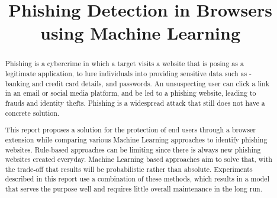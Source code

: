 \documentclass[conference]{IEEEtran}
\begin{document}
\title{Phishing Detection in Browsers \linebreak using Machine Learning\\
}

\author{
    \and

}

\maketitle

\begin{abstract}

    Phishing is a cybercrime in which a target visits a website that is posing as a legitimate application, to lure individuals into providing sensitive data such as - banking and credit card details, and passwords.
    An unsuspecting user can click a link in an email or social media platform, and be led to a phishing website, leading to frauds and identity thefts.
    Phishing is a widespread attack that still does not have a concrete solution.
    \par This report proposes a solution for the protection of end users through a browser extension while comparing various Machine Learning approaches to identify phishing websites.
    Rule-based approaches can be limiting since there is always new phishing websites created everyday. Machine Learning based approaches aim to solve that, with the trade-off that results will be probabilistic rather than absolute. Experiments described in this report use a combination of these methods, which results in a model that serves the purpose well and requires little overall maintenance in the long run.
\end{abstract}
\end{document}
